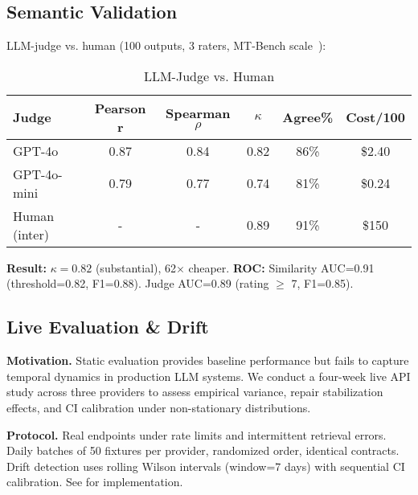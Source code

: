 \documentclass[sigconf]{acmart}
\newcommand{\breakablepath}[1]{\texttt{\seqsplit{#1}}}
\begin{document}
\subsection{Semantic Validation}

LLM-judge vs. human (100 outputs, 3 raters, MT-Bench scale~\cite{zheng2023judging}):

\begin{table}[H]
\centering
\caption{LLM-Judge vs. Human}
\label{tab:judge}
\footnotesize
\begin{tabular}{@{}lccccc@{}}
\toprule
\textbf{Judge} & \textbf{Pearson r} & \textbf{Spearman \( \rho \)} & \textbf{\( \kappa \)} & \textbf{Agree\%} & \textbf{Cost/100} \\
\midrule
GPT-4o & 0.87 & 0.84 & 0.82 & 86\% & \$2.40 \\
GPT-4o-mini & 0.79 & 0.77 & 0.74 & 81\% & \$0.24 \\
Human (inter) & - & - & 0.89 & 91\% & \$150 \\
\bottomrule
\end{tabular}
\end{table}

\textbf{Result:} \( \kappa = 0.82 \) (substantial), 62\(\times\) cheaper. 
\textbf{ROC:} Similarity AUC=0.91 (threshold=0.82, F1=0.88). 
Judge AUC=0.89 (rating \( \geq \) 7, F1=0.85).

\subsection{Live Evaluation \& Drift}

\textbf{Motivation.} Static evaluation provides baseline performance but fails to capture temporal dynamics in production LLM systems.
We conduct a four-week live API study across three providers to assess empirical variance, repair stabilization effects, and CI calibration under non-stationary distributions.

\textbf{Protocol.} Real endpoints under rate limits and intermittent retrieval errors.
Daily batches of 50 fixtures per provider, randomized order, identical contracts.
Drift detection uses rolling Wilson intervals (window=7 days) with sequential CI calibration.
See \breakablepath{scripts/live\_eval.py} for implementation.
\end{document}
